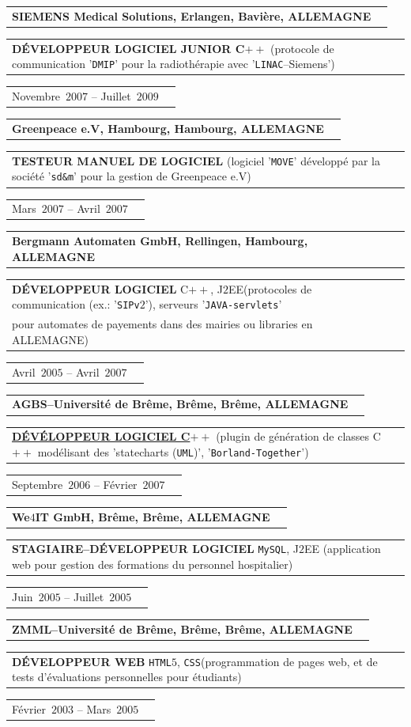 \documentclass[9pt,a4paper]{article} %
\makeatletter
\newcommand{\headerrow}[2]
{\begin{tabular*}{\linewidth}{l@{\extracolsep{\fill}}r}
	#1 &
	#2 \\
\end{tabular*}}
\newcommand{\headerrowONE}[1]{\headerrow{#1}{}}
\newcommand{\cplusplus}{C$++$\xspace}
\newcommand{\css}{\texttt{CSS}\xspace}
\newcommand{\html}{\texttt{HTML$5$}\xspace}
\newcommand{\jtwoee}{J$2$EE\xspace}
\newcommand{\mysql}{\texttt{MySQL}\xspace}
\newcommand{\cvitemdate}[2]{#1~$#2$\xspace}
\newcommand{\cvitempositionheld}[1]{\textbf{#1}\xspace}
\makeatother
\begin{document}
\vspace{0.3em}

\headerrowONE{\textbf{SIEMENS Medical Solutions, Erlangen, Bavière, ALLEMAGNE}}	
\headerrowONE{\cvitempositionheld{DÉVELOPPEUR LOGICIEL JUNIOR \cplusplus} (protocole 
de communication '\texttt{DMIP}' pour la radiothérapie avec '\texttt{LINAC}--Siemens')}
\headerrowONE{\cvitemdate{Novembre}{2007} -- \cvitemdate{Juillet}{2009}}	
	
\vspace{0.3em}

\headerrowONE{\textbf{Greenpeace e.V, Hambourg, Hambourg, ALLEMAGNE}}	
\headerrowONE{\cvitempositionheld{TESTEUR MANUEL DE LOGICIEL} 
(logiciel '\texttt{MOVE}' développé par la société '\texttt{sd\&m}' pour la gestion de Greenpeace e.V)}
\headerrowONE{\cvitemdate{Mars}{2007} -- \cvitemdate{Avril}{2007}}	

\vspace{0.3em}

\headerrowONE{\textbf{Bergmann Automaten GmbH, Rellingen, Hambourg, ALLEMAGNE}}	
\headerrowONE{\cvitempositionheld{DÉVELOPPEUR LOGICIEL} \cplusplus, \jtwoee (protocoles de
communication (ex.: '\texttt{SIPv$2$}'), serveurs '\texttt{JAVA-servlets}'\\
 pour automates de payements dans des mairies ou libraries en ALLEMAGNE)}
\headerrowONE{\cvitemdate{Avril}{2005} -- \cvitemdate{Avril}{2007}}	
	
\vspace{0.3em}

\headerrowONE{\textbf{AGBS--Université de Brême, Brême, Brême, ALLEMAGNE}}	
\headerrowONE{\href{http://www.informatik.uni-bremen.de/agbs/jp/papers/peleska_et_al_soqua2006.pdf}
	{\cvitempositionheld{DÉVÉLOPPEUR LOGICIEL \cplusplus}} (plugin de 
génération de classes \cplusplus modélisant des 'statecharts (\texttt{UML})', '\texttt{Borland-Together}')}
\headerrowONE{\cvitemdate{Septembre}{2006} -- \cvitemdate{Février}{2007}}	

\vspace{0.3em}

\headerrowONE{\textbf{We$4$IT GmbH, Brême, Brême, ALLEMAGNE}}	
\headerrowONE{\cvitempositionheld{STAGIAIRE--DÉVELOPPEUR LOGICIEL} \mysql, \jtwoee
(application web pour gestion des formations du personnel hospitalier)}
\headerrowONE{\cvitemdate{Juin}{2005} -- \cvitemdate{Juillet}{2005}}
	
\vspace{0.3em}

\headerrowONE{\textbf{ZMML--Université de Brême, Brême, Brême, ALLEMAGNE}}	
\headerrowONE{\cvitempositionheld{DÉVELOPPEUR WEB} \html, \css (programmation de pages web,
et de tests d'évaluations personnelles pour étudiants)}
\headerrowONE{\cvitemdate{Février}{2003} -- \cvitemdate{Mars}{2005}}	
\end{document}
